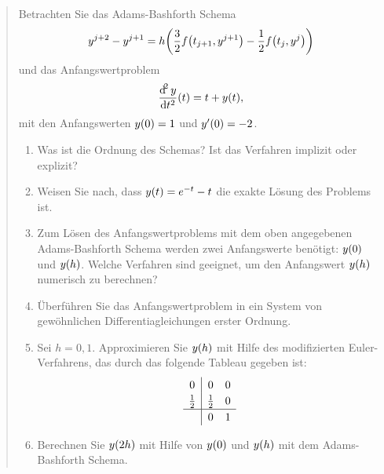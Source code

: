\documentclass{exercise}
\begin{document}
    
    \section{}
    
    \begin{quote}
        Betrachten Sie das Adams-Bashforth Schema
        \[
            y^{j + 2} - y^{j + 1} = h\parentheses*{\frac{3}{2}f\parentheses*{t_{j + 1}, y^{j + 1}} - \frac{1}{2}f\parentheses*{t_j, y^j}}
        \]
        und das Anfangswertproblem
        \[
            \frac{\d^2 y}{\d t^2}\parentheses*{t} = t + y\parentheses*{t},
        \]
        mit den Anfangswerten \(y\parentheses*{0} = 1\) und \(y'\parentheses*{0} = -2\).
        \begin{enumerate}
            \item Was ist die Ordnung des Schemas?
            Ist das Verfahren implizit oder explizit?
            \item Weisen Sie nach, dass \(y\parentheses*{t} =e^{-t} - t\) die exakte Lösung des Problems ist.
            \item Zum Lösen des Anfangswertproblems mit dem oben angegebenen Adams-Bashforth Schema werden zwei Anfangswerte benötigt: \(y\parentheses*{0}\) und \(y\parentheses*{h}\).
            Welche Verfahren sind geeignet, um den Anfangswert \(y\parentheses*{h}\) numerisch zu berechnen?
            \item Überführen Sie das Anfangswertproblem in ein System von gewöhnlichen Differentiagleichungen erster Ordnung.
            \item Sei \(h = 0,1\).
            Approximieren Sie \(y\parentheses*{h}\) mit Hilfe des modifizierten Euler-Verfahrens, das durch das folgende Tableau gegeben ist:
            \[
                \renewcommand\arraystretch{1.2}
				\begin{array}{c|cc}
					0 & 0 & 0\\
					\frac{1}{2} & \frac{1}{2} & 0\\
					\hline
					& 0 & 1
				\end{array}
            \]
            \item Berechnen Sie \(y\parentheses*{2h}\) mit Hilfe von \(y\parentheses*{0}\) und \(y\parentheses*{h}\) mit dem Adams-Bashforth Schema.
        \end{enumerate}
    \end{quote}
\end{document}

